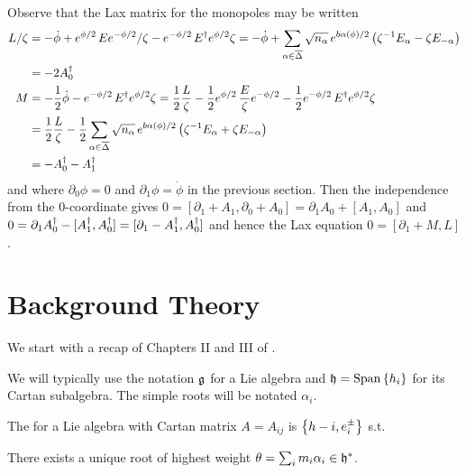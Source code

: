 \documentclass{article}
\begin{document}
Observe that the Lax matrix for the monopoles may be written 
\begin{align*}
L/\zeta&= -\dot\phi +e^{\phi/2}\,Ee^{-\phi/2}/\zeta-e^{-\phi/2}\,E\sp\dagger e^{\phi/2}\zeta
= -\dot\phi +
\sum_{\alpha\in\bar\Delta}\sqrt{n_\alpha}\, e^{b\alpha(\phi)/2} \left(
\zeta\sp{-1} E_\alpha - \zeta E_{-\alpha}
\right)\\
&=-2 A_0\sp\dagger\\
M&=-\frac12 \dot\phi -e^{-\phi/2}\,E\sp\dagger e^{\phi/2}\zeta
=\frac12 \frac{L}{\zeta} -\frac12 e^{\phi/2}\,\frac{E}{\zeta}e^{-\phi/2}-\frac12 e^{-\phi/2}\,E\sp\dagger e^{\phi/2}\zeta\\
&=\frac12 \frac{L}{\zeta} -\frac12 \sum_{\alpha\in\bar\Delta}\sqrt{n_\alpha}\, e^{b\alpha(\phi)/2} \left(
\zeta\sp{-1} E_\alpha + \zeta E_{-\alpha}
\right)\\
&=-A_0\sp\dagger - A_1\sp\dagger
\end{align*}
and where $\partial_0\phi=0$ and $\partial_1\phi=\dot\phi$ in the previous section. Then the independence
from the $0$-coordinate gives
$0=[\partial_1+A_1, \partial_0+A_0]= \partial_1 A_0 +[A_1, A_0]$ and
$0=\partial_1 A_0\sp\dagger -[A_1\sp\dagger, A_0\sp\dagger] = [\partial_1 -A_1\sp\dagger, A_0\sp\dagger] $
and hence the Lax equation $0=[\partial_1 +M,L]$.


\section{Background Theory}
We start with a recap of Chapters II and III of \cite{Humphreys1978}. 






 We will typically use the notation $\mf{g}$ for a Lie algebra and $\mf{h} = \spn\pbrace{h_i }$ for its Cartan subalgebra. The simple roots will be notated $\alpha_i$. 
 
\begin{definition}
The  for a Lie algebra with Cartan matrix $A = A_{ij}$ is $\pbrace{h-i, e^\pm_i}$ s.t. 
\end{definition}

\begin{prop}
	There exists a unique root of highest weight $\theta = \sum_i m_i \alpha_i \in \mf{h}^\ast$. 
\end{prop}
\end{document}
